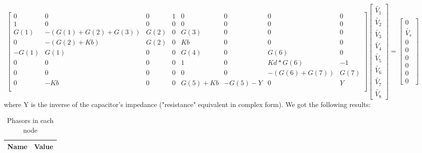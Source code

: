 \begin{equation*}
\begin{bmatrix}
   0 &      0 & 0 & 1 & 0 & 0 & 0 & 0\\
1 &      0 & 0 & 0 & 0 & 0 & 0 & 0\\
G(1) &   -(G(1)+G(2)+G(3)) &     G(2) &    0 &    G(3) &           0 &    0 &    0\\
0 &      -(G(2)+Kb) &            G(2) &     0 &     Kb &           0 &    0 &    0\\
-G(1) &    G(1) &                 0 &       0 &     G(4)          & 0    & G(6)     & 0\\
0 &        0 &                    0 &       0 &      1 &           0 &    Kd*G(6) &  -1\\
0 &        0 &                    0 &        0 &     0 &            0 &    -(G(6)+G(7)) &     G(7)\\
0 &        -Kb &                  0 &         0 &      G(5)+Kb &     -G(5)-Y &      0 &         Y\\

\end{bmatrix}
 \begin{bmatrix} \tilde{V_1}\\ \tilde{V_2}\\ \tilde{V_3}\\ \tilde{V_4}\\ \tilde{V_5}\\ \tilde{V_6}\\ \tilde{V_7} \\ \tilde{V_8} \end{bmatrix} =
 \begin{bmatrix} 0 \\ \tilde{V_s} \\ 0 \\ 0 \\ 0 \\0 \\ 0 \\ 0\end{bmatrix}
\end{equation*}
where Y is the inverse of the capacitor's impedance ("resistance" equivalent in complex form).
We got the following results:

\begin{table}[H]
  \centering
  \begin{tabular}{|l|r|}
    \hline
    {\bf Name} & {\bf Value} \\ \hline
    
  \end{tabular}
  \caption{Phasors in each node}
  \label{tab:complex_phasors}
\end{table}

